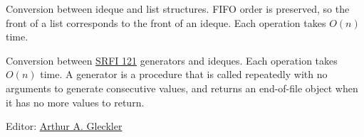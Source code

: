 \begin{entry}{%
  }

  Conversion between ideque and list structures. FIFO order is
  preserved, so the front of a list corresponds to the front of an
  ideque. Each operation takes $O(n)$ time.
\end{entry}

\begin{entry}{%
  }

  Conversion between
  \href{http://srfi.schemers.org/srfi-121/srfi-121.html}{SRFI 121}
  generators and ideques. Each operation takes $O(n)$ time. A generator
  is a procedure that is called repeatedly with no arguments to
  generate consecutive values, and returns an end-of-file object when
  it has no more values to return.
\end{entry}

Editor: \href{mailto:srfi-editors+at+srfi+dot+schemers+dot+org}{Arthur
A. Gleckler}
